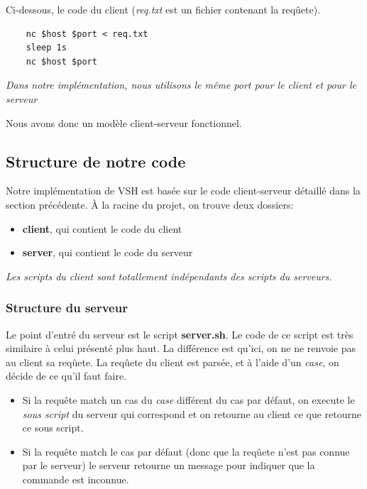 \documentclass[titlepage]{article}
\begin{document}
	Ci-dessous, le code du client (\textit{req.txt} est un fichier contenant la reqûete).

	\begin{lstlisting}
	nc $host $port < req.txt
	sleep 1s
	nc $host $port
	\end{lstlisting}

	\textit{Dans notre implémentation, nous utilisons le même port pour le client et pour le serveur}

	Nous avons donc un modèle client-serveur fonctionnel.

	\subsection{Structure de notre code}

	Notre implémentation de VSH est basée sur le code client-serveur détaillé dans la section précédente.
	À la racine du projet, on trouve deux dossiers:
	\begin{itemize}  
		\item \textbf{client}, qui contient le code du client 
		\item \textbf{server}, qui contient le code du serveur
	\end{itemize}

	\textit{Les scripts du client sont totallement indépendants des scripts du serveurs.}

	\subsubsection{Structure du serveur}
	Le point d'entré du serveur est le script \textbf{server.sh}. Le code de ce script est très similaire à celui présenté plus haut. La différence est qu'ici, on ne ne renvoie pas au client sa reqûete. La reqûete du client est parsée, et à l'aide d'un \textit{case}, on décide de ce qu'il faut faire.
	\begin{itemize}  
		\item Si la requête match un cas du \textit{case} différent du cas par défaut, on execute le \textit{sous script} du serveur qui correspond et on retourne au client ce que retourne ce sous script.
		\item Si la requête match le cas par défaut (donc que la reqûete n'est pas connue par le serveur) le serveur retourne un message pour indiquer que la commande est inconnue.
	\end{itemize}
\end{document}
